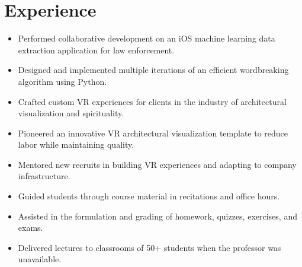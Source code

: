 \documentclass[]{deedy_resume}
\begin{document}
\hfill
\begin{minipage}[t]{0.63\textwidth} 


\section{Experience}
\begin{itemize}[noitemsep,topsep=0pt]
\item Performed collaborative development on an iOS machine learning data extraction application for law enforcement.
\item Designed and implemented multiple iterations of an efficient wordbreaking algorithm using Python.
\end{itemize}
\vspace{3mm}

\begin{itemize}[noitemsep,topsep=0pt]
\item Crafted custom VR experiences for clients in the industry of architectural visualization and spirituality.
\item Pioneered an innovative VR architectural visualization template to reduce labor while maintaining quality.
\item Mentored new recruits in building VR experiences and adapting to company infrastructure.
\end{itemize}
\vspace{3mm}

\begin{itemize}[noitemsep,topsep=0pt]
\itemsep0em 
\item Guided students through course material in recitations and office hours.
\item Assisted in the formulation and grading of homework, quizzes, exercises, and exams.
\item Delivered lectures to classrooms of 50+ students when the professor was unavailable.
\end{itemize}
\sectionsep



\end{minipage}
\end{document}
